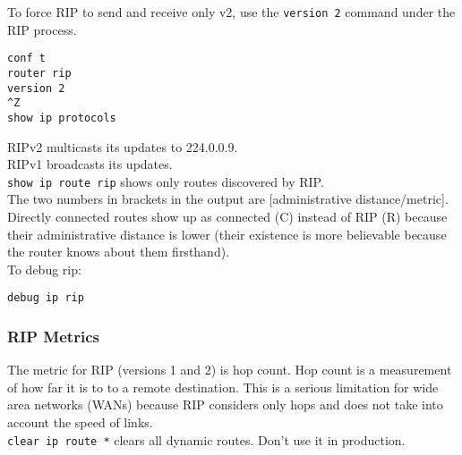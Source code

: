 To force RIP to send and receive only v2, use the \texttt{version 2}
command under the RIP process.

\begin{verbatim}
conf t
router rip
version 2
^Z
show ip protocols
\end{verbatim}

RIPv2 multicasts its updates to 224.0.0.9.\\

RIPv1 broadcasts its updates.\\

\texttt{show ip route rip} shows only routes discovered by RIP.\\

The two numbers in brackets in the output are [administrative distance/metric].\\

Directly connected routes show up as connected (C) instead of RIP (R) because
their administrative distance is lower (their existence is more believable
because the router knows about them firsthand).\\

To debug rip:

\begin{verbatim}
debug ip rip  
\end{verbatim}

\subsubsection{RIP Metrics}

The metric for RIP (versions 1 and 2) is hop count. Hop count is a measurement
of how far it is to to a remote destination. This is a serious limitation for
wide area networks (WANs) because RIP considers only hops and does not take
into account the speed of links.\\

\texttt{clear ip route *} clears all dynamic routes. Don't use it in
production.
